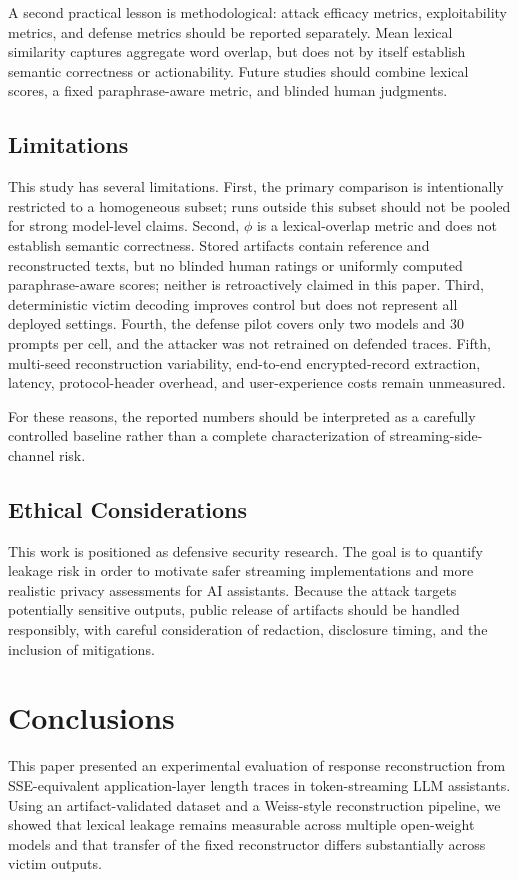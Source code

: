 \documentclass[journal,article,submit,pdftex,moreauthors]{Definitions/mdpi}
\begin{document}
A second practical lesson is methodological: attack efficacy metrics, exploitability metrics, and defense metrics should be reported separately. Mean lexical similarity captures aggregate word overlap, but does not by itself establish semantic correctness or actionability. Future studies should combine lexical scores, a fixed paraphrase-aware metric, and blinded human judgments.

\subsection{Limitations}
This study has several limitations. First, the primary comparison is intentionally restricted to a homogeneous subset; runs outside this subset should not be pooled for strong model-level claims. Second, $\phi$ is a lexical-overlap metric and does not establish semantic correctness. Stored artifacts contain reference and reconstructed texts, but no blinded human ratings or uniformly computed paraphrase-aware scores; neither is retroactively claimed in this paper. Third, deterministic victim decoding improves control but does not represent all deployed settings. Fourth, the defense pilot covers only two models and 30 prompts per cell, and the attacker was not retrained on defended traces. Fifth, multi-seed reconstruction variability, end-to-end encrypted-record extraction, latency, protocol-header overhead, and user-experience costs remain unmeasured.

For these reasons, the reported numbers should be interpreted as a carefully controlled baseline rather than a complete characterization of streaming-side-channel risk.

\subsection{Ethical Considerations}
This work is positioned as defensive security research. The goal is to quantify leakage risk in order to motivate safer streaming implementations and more realistic privacy assessments for AI assistants. Because the attack targets potentially sensitive outputs, public release of artifacts should be handled responsibly, with careful consideration of redaction, disclosure timing, and the inclusion of mitigations.

\section{Conclusions}
This paper presented an experimental evaluation of response reconstruction from SSE-equivalent application-layer length traces in token-streaming LLM assistants. Using an artifact-validated dataset and a Weiss-style reconstruction pipeline, we showed that lexical leakage remains measurable across multiple open-weight models and that transfer of the fixed reconstructor differs substantially across victim outputs.
\end{document}
